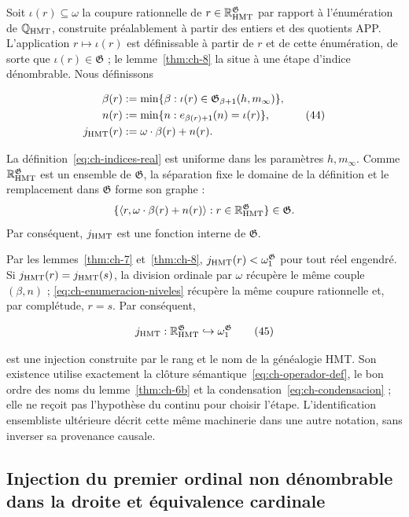 Soit \(\iota(r)\subseteq\omega\) la coupure rationnelle de
\(r\in\mathbb R_{\rm HMT}^{\mathfrak G}\) par rapport à l’énumération de
\(\mathbb Q_{\rm HMT}\), construite préalablement à partir des entiers et des quotients
APP. L’application \(r\mapsto\iota(r)\) est définissable à partir de \(r\) et de cette énumération,
de sorte que \(\iota(r)\in\mathfrak G\) ; le lemme~\ref{thm:ch-8} la situe à une étape
d’indice dénombrable. Nous définissons

\[
 \begin{aligned}
  \beta(r)&:=\min\{\beta:
       \iota(r)\in\mathfrak G_{\beta+1}(h,m_\infty)\},\\
  n(r)&:=\min\{n:e_{\beta(r)+1}(n)=\iota(r)\},\\
  j_{\rm HMT}(r)&:=\omega\cdot\beta(r)+n(r).
 \end{aligned}
\tag{44}\label{eq:ch-indices-real}
\]

La définition~\eqref{eq:ch-indices-real} est uniforme dans les paramètres \(h,m_\infty\). Comme \(\mathbb R_{\rm HMT}^{\mathfrak G}\) est un ensemble de \(\mathfrak G\), la séparation fixe le domaine de la définition et le remplacement dans \(\mathfrak G\) forme son graphe :
\[
 \{\langle r,\omega\cdot\beta(r)+n(r)\rangle:
 r\in\mathbb R_{\rm HMT}^{\mathfrak G}\}\in\mathfrak G.
\]
Par conséquent, \(j_{\rm HMT}\) est une fonction interne de \(\mathfrak G\).

Par les lemmes~\ref{thm:ch-7} et~\ref{thm:ch-8},
\(j_{\rm HMT}(r)<\omega_1^{\mathfrak G}\) pour tout
réel engendré. Si \(j_{\rm HMT}(r)=j_{\rm HMT}(s)\), la division ordinale par
\(\omega\) récupère le même couple \((\beta,n)\) ; \eqref{eq:ch-enumeracion-niveles} récupère la même coupure
rationnelle et, par complétude, \(r=s\). Par conséquent,

\[
 j_{\rm HMT}:\mathbb R_{\rm HMT}^{\mathfrak G}
 \hookrightarrow\omega_1^{\mathfrak G}
\tag{45}\label{eq:ch-inyeccion-j}
\]

est une injection construite par le rang et le nom de la généalogie HMT. Son existence utilise exactement la clôture sémantique~\eqref{eq:ch-operador-def}, le bon ordre des noms du lemme~\ref{thm:ch-6b} et la condensation~\eqref{eq:ch-condensacion} ; elle ne reçoit pas l'hypothèse du continu pour choisir l'étape. L'identification ensembliste ultérieure décrit cette même machinerie dans une autre notation, sans inverser sa provenance causale.

\subsection{Injection du premier ordinal non dénombrable dans la droite et équivalence cardinale}

